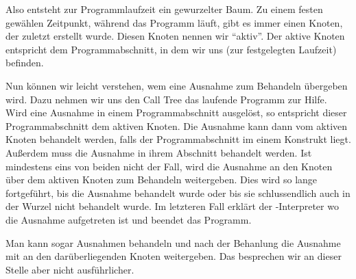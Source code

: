 Also entsteht zur Programmlaufzeit ein gewurzelter Baum.
Zu einem festen gewählen Zeitpunkt, während das Programm läuft, gibt es immer einen Knoten, der zuletzt erstellt wurde.
Diesen Knoten nennen wir ``aktiv''.
Der aktive Knoten entspricht dem Programmabschnitt, in dem wir uns (zur festgelegten Laufzeit) befinden.

Nun können wir leicht verstehen, wem eine Ausnahme zum Behandeln übergeben wird.
Dazu nehmen wir uns den Call Tree das laufende Programm zur Hilfe.
Wird eine Ausnahme in einem Programmabschnitt ausgelöst, so entspricht dieser Programmabschnitt dem aktiven Knoten.
Die Ausnahme kann dann vom aktiven Knoten behandelt werden, falls der Programmabschnitt im einem  Konstrukt liegt.
Außerdem muss die Ausnahme in ihrem  Abschnitt behandelt werden.
Ist mindestens eins von beiden nicht der Fall, wird die Ausnahme an den Knoten über dem aktiven Knoten zum Behandeln weitergeben.
Dies wird so lange fortgeführt, bis die Ausnahme behandelt wurde oder bis sie schlussendlich auch in der Wurzel nicht behandelt wurde.
Im letzteren Fall erklärt der \Python-Interpreter wo die Ausnahme aufgetreten ist und beendet das Programm.

Man kann sogar Ausnahmen behandeln und nach der Behanlung die Ausnahme mit  an den darüberliegenden Knoten weitergeben.
Das besprechen wir an dieser Stelle aber nicht ausführlicher.

